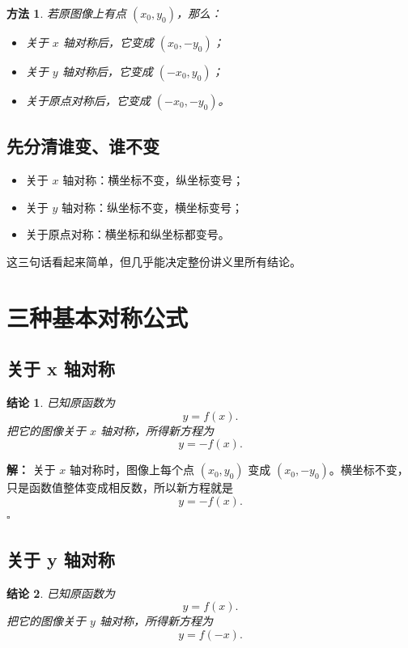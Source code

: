 \documentclass[11pt,a4paper,fontset=fandol]{ctexart}
\theoremstyle{formaltheorem}
\newtheorem{theorem}{结论}[section]
\newtheorem{method}{方法}[section]
\theoremstyle{formalexample}
\newenvironment{solution}{\par\noindent\textbf{解：}}{\hfill$\square$\par}
\begin{document}
\begin{method}
若原图像上有点 $(x_0,y_0)$，那么：
\begin{itemize}
  \item 关于 $x$ 轴对称后，它变成 $(x_0,-y_0)$；
  \item 关于 $y$ 轴对称后，它变成 $(-x_0,y_0)$；
  \item 关于原点对称后，它变成 $(-x_0,-y_0)$。
\end{itemize}
\end{method}

\subsection{先分清谁变、谁不变}
\begin{itemize}
  \item 关于 $x$ 轴对称：横坐标不变，纵坐标变号；
  \item 关于 $y$ 轴对称：纵坐标不变，横坐标变号；
  \item 关于原点对称：横坐标和纵坐标都变号。
\end{itemize}

这三句话看起来简单，但几乎能决定整份讲义里所有结论。

\section{三种基本对称公式}

\subsection{关于 x 轴对称}

\begin{theorem}
已知原函数为
\[
y=f(x).
\]
把它的图像关于 $x$ 轴对称，所得新方程为
\[
y=-f(x).
\]
\end{theorem}

\begin{solution}
关于 $x$ 轴对称时，图像上每个点 $(x_0,y_0)$ 变成 $(x_0,-y_0)$。横坐标不变，只是函数值整体变成相反数，所以新方程就是
\[
y=-f(x).
\]
\end{solution}

\subsection{关于 y 轴对称}

\begin{theorem}
已知原函数为
\[
y=f(x).
\]
把它的图像关于 $y$ 轴对称，所得新方程为
\[
y=f(-x).
\]
\end{theorem}
\end{document}
